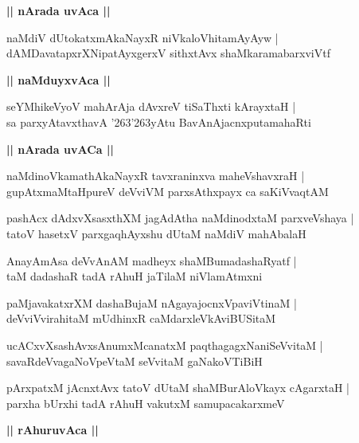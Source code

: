 \documentclass[twoside,12pt,openright]{book}
\def\S{\char'263}
\newcounter{shloka}[chapter]
\def\uvaca#1{\centerline{{\large\textbf{#1}}}}
\begin{document}
\uvaca{|| nArada uvAca ||}

\begin{shloka}%
naMdiV dUtokatxmAkaNayxR niVkaloVhitamAyAyw |\\
dAMDavatapxrXNipatAyxgerxV sithxtAvx shaMkaramabarxviVtf 
\end{shloka}

\uvaca{|| naMduyxvAca ||}

\begin{shloka}%
seYMhikeVyoV mahArAja dAvxreV tiSaThxti kArayxtaH |\\
sa parxyAtavxthavA \S \S yAtu BavAnAjacnxputamahaRti 
\end{shloka}

\uvaca{|| nArada uvACa ||}

\begin{shloka}%
naMdinoVkamathAkaNayxR tavxraninxva maheVshavxraH |\\
gupAtxmaMtaHpureV deVviVM parxsAthxpayx ca saKiVvaqtAM 
\end{shloka}

\begin{shloka}%
pashAcx dAdxvXsasxthXM jagAdAtha naMdinodxtaM parxveVshaya |\\
tatoV hasetxV parxgaqhAyxshu dUtaM naMdiV mahAbalaH 
\end{shloka}

\begin{shloka}%
AnayAmAsa deVvAnAM madheyx shaMBumadashaRyatf |\\
taM dadashaR tadA rAhuH jaTilaM niVlamAtmxni
\end{shloka}

\begin{shloka}%
paMjavakatxrXM dashaBujaM nAgayajocnxVpaviVtinaM |\\
deVviVvirahitaM mUdhinxR caMdarxleVkAviBUSitaM 
\end{shloka}

\begin{shloka}%
ucACxvXsashAvxsAnumxMcanatxM paqthagagxNaniSeVvitaM |\\
savaRdeVvagaNoVpeVtaM seVvitaM gaNakoVTiBiH
\end{shloka}

\begin{shloka}%
pArxpatxM jAcnxtAvx tatoV dUtaM shaMBurAloVkayx cAgarxtaH |\\
parxha bUrxhi tadA rAhuH vakutxM samupacakarxmeV 
\end{shloka}

\uvaca{|| rAhuruvAca ||}
\end{document}
